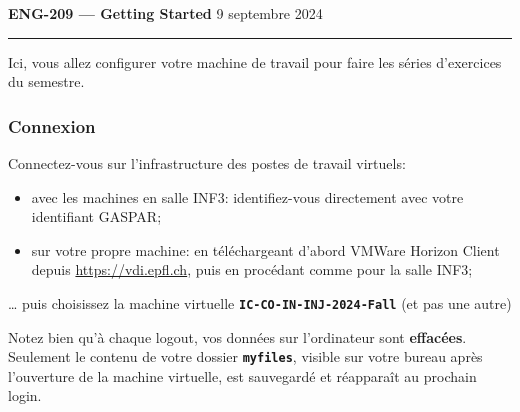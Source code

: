 \documentclass[10pt]{article}
\begin{document}
\setlength{\parskip}{5pt plus 1pt minus 1pt}
\setlength{\parindent}{0pt}
\setlength{\marginparsep}{0.5cm}
\def\thesection{Exercice \arabic{section}.}

\DeclareRobustCommand{\cmdkey}{\raisebox{-.06em}{\texttt{[image: command.pdf]}}}

\newcommand\•{$\cdot$}
\newcommand\code[1]{\texttt{\textbf{\small #1}}}
\newcommand\ui[1]{\textsf{#1}}
\newcommand{\marginnote}[1]{\marginpar{\flushleft{{\scriptsize ~\\} \textsf{#1}}}}


{
	\sffamily
	{\Large \bfseries ENG-209 --- Getting Started}
	{\hfill 9 septembre 2024}

}


\vspace{0.1cm}
\hrule
\vspace{0.3cm}




\newcommand{\bigsubsection}[1]{
	\vspace{0.7cm}
	\textbf{\textit{\large #1}}
}
Ici, vous allez configurer votre machine de travail pour faire les séries d'exercices du semestre.

\subsubsection*{Connexion}

Connectez-vous sur l'infrastructure des postes de travail virtuels:
\begin{itemize}
\itemsep0em
\item avec les machines en salle INF3: identifiez-vous directement avec votre identifiant GASPAR;
\item sur votre propre machine: en téléchargeant d'abord VMWare Horizon Client depuis \url{https://vdi.epfl.ch}, puis en procédant comme pour la salle INF3;
\end{itemize}

… puis choisissez la machine virtuelle \code{IC-CO-IN-INJ-2024-Fall} (et pas une autre)

Notez bien qu'à chaque logout, vos données sur l’ordinateur sont \textbf{effacées}. Seulement le contenu de votre dossier \code{myfiles}, visible sur votre bureau après l'ouverture de la machine virtuelle, est sauvegardé et réapparaît au prochain login.
\end{document}

